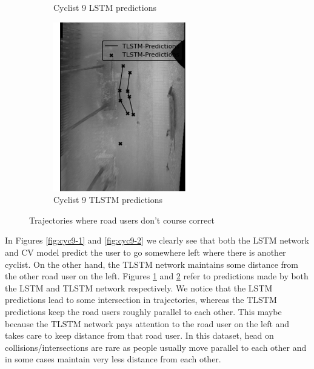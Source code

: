 \documentclass{article}
\begin{document}
\begin{figure}[H]
\begin{subfigure}{0.40\textwidth}
  \caption{Cyclist 9 LSTM predictions}
  \label{fig:cyc9-l}
\end{subfigure}
\begin{subfigure}{0.40\textwidth}
  \centering
  \includegraphics[width=\linewidth]{quali_results/cyc-9-t.png}
  \caption{Cyclist 9 TLSTM predictions}
  \label{fig:cyc9-t}
\end{subfigure}
\caption{Trajectories where road users don't course correct}
\label{fig:cyc9}
\end{figure}

In Figures \ref{fig:cyc9-1} and \ref{fig:cyc9-2} we clearly see that both the LSTM network and CV model predict the user to go somewhere left where there is another cyclist. On the other hand, the TLSTM network maintains some distance from the other road user on the left. Figures \ref{fig:cyc9-l} and \ref{fig:cyc9-t} refer to predictions made by both the LSTM and TLSTM network respectively. We notice that the LSTM predictions lead to some intersection in trajectories, whereas the TLSTM predictions keep the road users roughly parallel to each other. This maybe because the TLSTM network pays attention to the road user on the left and takes care to keep distance from that road user. In this dataset, head on collisions/intersections are rare as people usually move parallel to each other and in some cases maintain very less distance from each other. 
\end{document}
